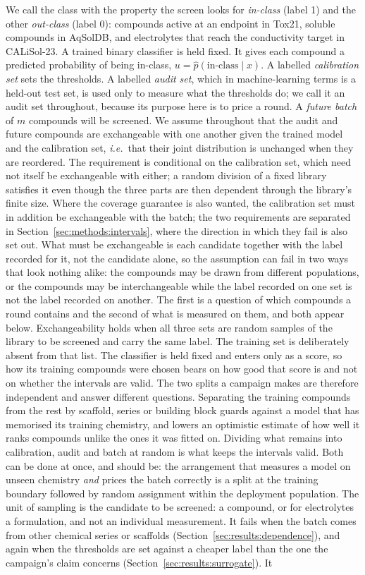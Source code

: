 \documentclass[twocolumn,10pt]{article}
\begin{document}
We call the class with the property the screen looks for \emph{in-class} (label 1) and the other \emph{out-class} (label 0): compounds active at an endpoint in Tox21, soluble compounds in AqSolDB, and electrolytes that reach the conductivity target in CALiSol-23. A trained binary classifier is held fixed. It gives each compound a predicted probability of being in-class, $u=\hat p(\text{in-class}\mid x)$. A labelled \emph{calibration set} sets the thresholds. A labelled \emph{audit set}, which in machine-learning terms is a held-out test set, is used only to measure what the thresholds do; we call it an audit set throughout, because its purpose here is to price a round. A \emph{future batch} of $m$ compounds will be screened. We assume throughout that the audit and future compounds are exchangeable with one another given the trained model and the calibration set, \textit{i.e.}\ that their joint distribution is unchanged when they are reordered. The requirement is conditional on the calibration set, which need not itself be exchangeable with either; a random division of a fixed library satisfies it even though the three parts are then dependent through the library's finite size. Where the coverage guarantee is also wanted, the calibration set must in addition be exchangeable with the batch; the two requirements are separated in Section~\ref{sec:methods:intervals}, where the direction in which they fail is also set out. What must be exchangeable is each candidate together with the label recorded for it, not the candidate alone, so the assumption can fail in two ways that look nothing alike: the compounds may be drawn from different populations, or the compounds may be interchangeable while the label recorded on one set is not the label recorded on another. The first is a question of which compounds a round contains and the second of what is measured on them, and both appear below. Exchangeability holds when all three sets are random samples of the library to be screened and carry the same label. The training set is deliberately absent from that list. The classifier is held fixed and enters only as a score, so how its training compounds were chosen bears on how good that score is and not on whether the intervals are valid. The two splits a campaign makes are therefore independent and answer different questions. Separating the training compounds from the rest by scaffold, series or building block guards against a model that has memorised its training chemistry, and lowers an optimistic estimate of how well it ranks compounds unlike the ones it was fitted on. Dividing what remains into calibration, audit and batch at random is what keeps the intervals valid. Both can be done at once, and should be: the arrangement that measures a model on unseen chemistry \emph{and} prices the batch correctly is a split at the training boundary followed by random assignment within the deployment population. The unit of sampling is the candidate to be screened: a compound, or for electrolytes a formulation, and not an individual measurement. It fails when the batch comes from other chemical series or scaffolds (Section~\ref{sec:results:dependence}), and again when the thresholds are set against a cheaper label than the one the campaign's claim concerns (Section~\ref{sec:results:surrogate}). It 
\end{document}
